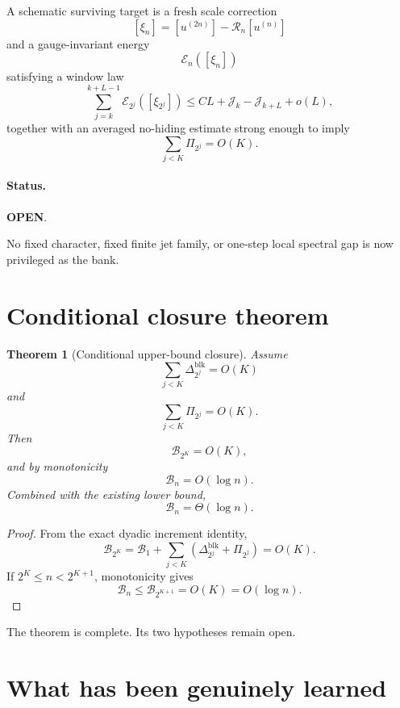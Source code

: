 \documentclass[11pt,a4paper]{article}
\newcommand{\Bcal}{\mathcal B}
\newcommand{\Ecal}{\mathcal E}
\newcommand{\Jcal}{\mathcal J}
\newcommand{\blk}{\mathrm{blk}}
\newcommand{\OPEN}{\textcolor{red!70!black}{\textbf{OPEN}}}
\newtheorem{theorem}{Theorem}
\begin{document}
A schematic surviving target is a fresh scale correction
\[
[\xi_n]
=
[u^{(2n)}]
-
\mathscr R_n[u^{(n)}]
\]
and a gauge-invariant energy
\[
\Ecal_n([\xi_n])
\]
satisfying a window law
\begin{equation}
\boxed{
\sum_{j=k}^{k+L-1}
\Ecal_{2^j}([\xi_{2^j}])
\le
CL+\Jcal_k-\Jcal_{k+L}+o(L),
}
\tag{37}
\end{equation}
together with an averaged no-hiding estimate strong enough to imply
\begin{equation}
\boxed{
\sum_{j<K}\Pi_{2^j}=O(K).
}
\tag{38}
\end{equation}

\paragraph{Status.}
\OPEN.

No fixed character, fixed finite jet family, or one-step local spectral gap
is now privileged as the bank.

\section{Conditional closure theorem}

\begin{theorem}[Conditional upper-bound closure]
Assume
\[
\sum_{j<K}\Delta_{2^j}^{\blk}=O(K)
\]
and
\[
\sum_{j<K}\Pi_{2^j}=O(K).
\]
Then
\[
\Bcal_{2^K}=O(K),
\]
and by monotonicity
\[
\boxed{
\Bcal_n=O(\log n).
}
\]
Combined with the existing lower bound,
\[
\boxed{
\Bcal_n=\Theta(\log n).
}
\]
\end{theorem}

\begin{proof}
From the exact dyadic increment identity,
\[
\Bcal_{2^{K}}
=
\Bcal_1
+
\sum_{j<K}
\left(
\Delta_{2^j}^{\blk}+\Pi_{2^j}
\right)
=
O(K).
\]
If \(2^K\le n<2^{K+1}\), monotonicity gives
\[
\Bcal_n\le\Bcal_{2^{K+1}}=O(K)=O(\log n).
\]
\end{proof}

The theorem is complete.
Its two hypotheses remain open.

\section{What has been genuinely learned}
\end{document}
